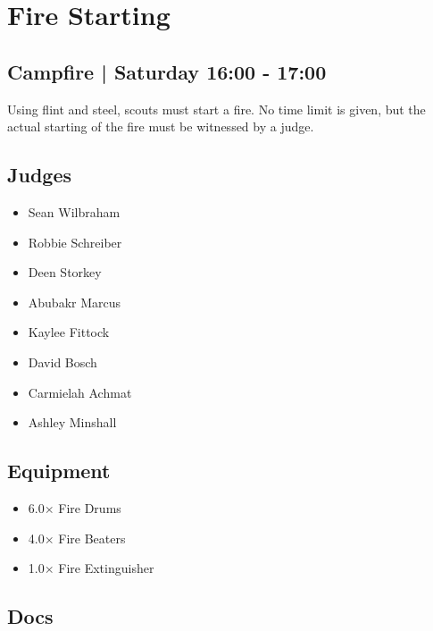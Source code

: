 \documentclass[10pt]{article}
\begin{document}
		\begin{minipage}{\linewidth}
		\setcounter{section}{12}
	\section{Fire Starting }
	\subsection*{Campfire | Saturday 16:00 - 17:00}

	Using flint and steel, scouts must start a fire. No time limit is given, but the actual starting of the fire must be witnessed by a judge.

	\begin{multicols}{2}
	\subsection*{\faUsers \: Judges}
	\begin{itemize}
			\item Sean Wilbraham
			\item Robbie Schreiber
			\item Deen Storkey
			\item Abubakr Marcus
			\item Kaylee Fittock
			\item David Bosch
			\item Carmielah Achmat
			\item Ashley Minshall
		\end{itemize}
	\columnbreak
	\subsection*{\faWrench \: Equipment}
	
        \begin{itemize}
                    \item 6.0$\times$ \: Fire Drums
                    \item 4.0$\times$ \: Fire Beaters
                    \item 1.0$\times$ \: Fire Extinguisher
                \end{itemize}
                \vfill\null
        \subsection*{\faFile \: Docs}
     	\end{multicols}


	\vspace{1cm}
	\end{minipage}
\end{document}

